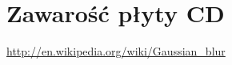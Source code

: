 \documentclass[licencjacka]{pracamgr}
\begin{document}
    
    
    

  \chapter{Zawarość płyty CD}


\begin{thebibliography}{99}
  \item{\url{http://en.wikipedia.org/wiki/Gaussian_blur}}

\end{thebibliography}
\end{document}
